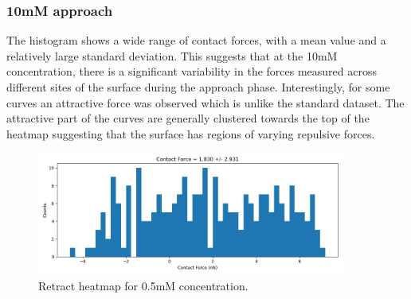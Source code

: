 


\newpage
\subsubsection{10mM approach}

The histogram shows a wide range of contact forces, with a mean value and a relatively large standard deviation. This suggests that at the 10mM concentration, there is a significant variability in the forces measured across different sites of the surface during the approach phase. Interestingly, for some curves an attractive force was observed which is unlike the standard dataset. The attractive part of the curves are generally clustered towards the top of the heatmap suggesting that the surface has regions of varying repulsive forces. 

\begin{figure}[h!!!]
    \centering
    \includegraphics[width=0.9\textwidth]{chapter7/ForceMaps/10mM/approach_f_c_hist.jpg}
    \caption{Retract heatmap for 0.5mM concentration.}
    \label{fig:appro_fc_10mM}
\end{figure}

